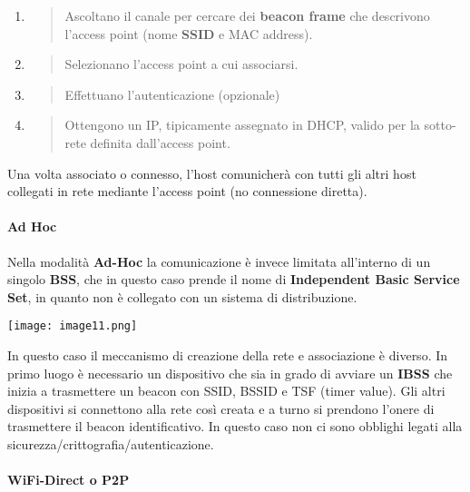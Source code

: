 \begin{enumerate}
\def\labelenumi{\arabic{enumi}.}
\item
  \begin{quote}
  Ascoltano il canale per cercare dei \textbf{beacon frame} che
  descrivono l'access point (nome \textbf{SSID} e MAC address).
  \end{quote}
\item
  \begin{quote}
  Selezionano l'access point a cui associarsi.
  \end{quote}
\item
  \begin{quote}
  Effettuano l'autenticazione (opzionale)
  \end{quote}
\item
  \begin{quote}
  Ottengono un IP, tipicamente assegnato in DHCP, valido per la
  sotto-rete definita dall'access point.
  \end{quote}
\end{enumerate}

Una volta associato o connesso, l'host comunicherà con tutti gli altri
host collegati in rete mediante l'access point (no connessione diretta).

\paragraph{Ad Hoc}\label{ad-hoc}

Nella modalità \textbf{Ad-Hoc} la comunicazione è invece limitata
all'interno di un singolo \textbf{BSS}, che in questo caso prende il
nome di \textbf{Independent Basic Service Set}, in quanto non è
collegato con un sistema di distribuzione.

\texttt{[image: image11.png]}

In questo caso il meccanismo di creazione della rete e associazione è
diverso. In primo luogo è necessario un dispositivo che sia in grado di
avviare un \textbf{IBSS} che inizia a trasmettere un beacon con SSID,
BSSID e TSF (timer value). Gli altri dispositivi si connettono alla rete
così creata e a turno si prendono l'onere di trasmettere il beacon
identificativo. In questo caso non ci sono obblighi legati alla
sicurezza/crittografia/autenticazione.

\paragraph{WiFi-Direct o P2P}\label{wifi-direct-o-p2p}

